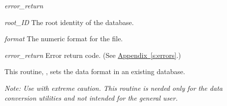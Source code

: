 \begin{Ventryi}{\textit{error\_return}}
\item[\textit{root\_ID}]
     The root identity of the database.
\item[\textit{format}]
     The numeric format for the file.
\item[\textit{error\_return}]
     Error return code.
     (See \hyperref[s:errors]{Appendix~\ref*{s:errors}}.)
\end{Ventryi}

This routine, , sets the data format in
an existing database.

\noindent
\emph{Note: Use with extreme caution. This routine is needed only for the
data conversion utilities and not intended for the general user.}
